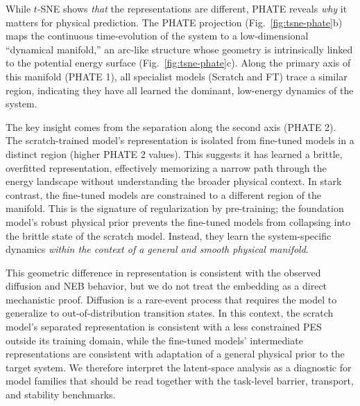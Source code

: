 \documentclass[pdflatex,sn-mathphys-num]{sn-jnl}%
\providecommand{\reviewermap}[3]{}
\theoremstyle{thmstyleone}%
\theoremstyle{thmstyletwo}%
\theoremstyle{thmstylethree}%
\begin{document}
While $t$-SNE shows \textit{that} the representations are different, PHATE reveals \textit{why} it matters for physical prediction. The PHATE projection (Fig.~\ref{fig:tsne-phate}b) maps the continuous time-evolution of the system to a low-dimensional ``dynamical manifold,'' an arc-like structure whose geometry is intrinsically linked to the potential energy surface (Fig.~\ref{fig:tsne-phate}c). Along the primary axis of this manifold (PHATE 1), all specialist models (Scratch and FT) trace a similar region, indicating they have all learned the dominant, low-energy dynamics of the system.

The key insight comes from the separation along the second axis (PHATE 2). The scratch-trained model's representation is isolated from fine-tuned models in a distinct region (higher PHATE 2 values). This suggests it has learned a brittle, overfitted representation, effectively memorizing a narrow path through the energy landscape without understanding the broader physical context. In stark contrast, the fine-tuned models are constrained to a different region of the manifold. This is the signature of regularization by pre-training; the foundation model's robust physical prior prevents the fine-tuned models from collapsing into the brittle state of the scratch model. Instead, they learn the system-specific dynamics \textit{within the context of a general and smooth physical manifold}.

\reviewermap{REV-A6/REV-C11/REV-C12}{done-local}{Claims softened to consistent-with; original 6191-d euclidean silhouette is 0.333; zero feature stub dropped.}
This geometric difference in representation is consistent with the observed diffusion and NEB behavior, but we do not treat the embedding as a direct mechanistic proof. Diffusion is a rare-event process that requires the model to generalize to out-of-distribution transition states. In this context, the scratch model's separated representation is consistent with a less constrained PES outside its training domain, while the fine-tuned models' intermediate representations are consistent with adaptation of a general physical prior to the target system. We therefore interpret the latent-space analysis as a diagnostic for model families that should be read together with the task-level barrier, transport, and stability benchmarks.
\end{document}
